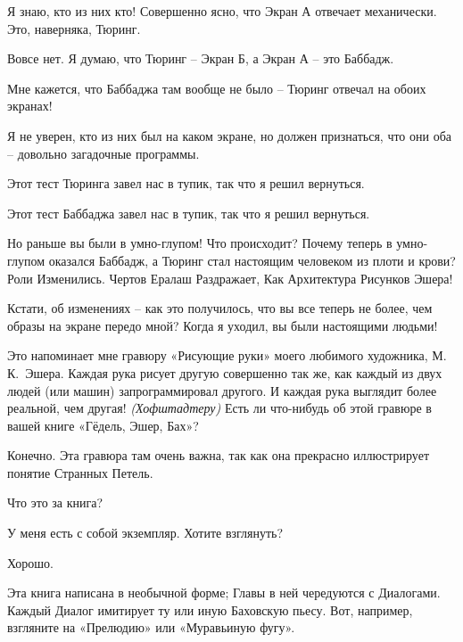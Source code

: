 \documentclass[../main.tex]{subfiles}
\begin{document}
\begin{dialogue}
 Я знаю, кто из них кто! Совершенно ясно, что Экран А отвечает механически. Это, наверняка, Тюринг.

 Вовсе нет. Я думаю, что Тюринг \--- Экран Б, а Экран А \--- это Баббадж.

 Мне кажется, что Баббаджа там вообще не было \--- Тюринг отвечал на обоих экранах!

 Я не уверен, кто из них был на каком экране, но должен признаться, что они оба \--- довольно загадочные программы.


 Этот тест Тюринга завел нас в тупик, так что я решил вернуться.

 Этот тест Баббаджа завел нас в тупик, так что я решил вернуться.

 Но раньше вы были в умно-глупом! Что происходит? Почему теперь в умно-глупом оказался Баббадж, а Тюринг стал настоящим человеком из плоти и крови? Роли Изменились. Чертов Ералаш Раздражает, Как Архитектура Рисунков Эшера!

 Кстати, об изменениях \--- как это получилось, что вы все теперь не более, чем образы на экране передо мной? Когда я уходил, вы были настоящими людьми!

 Это напоминает мне гравюру «Рисующие руки» моего любимого художника, М.\,К.~Эшера. Каждая рука рисует другую совершенно так же, как каждый из двух людей (или машин) запрограммировал другого. И каждая рука выглядит более реальной, чем другая! \emph{(Хофштадтеру)} Есть ли что-нибудь об этой гравюре в вашей книге «Гёдель, Эшер, Бах»?

 Конечно. Эта гравюра там очень важна, так как она прекрасно иллюстрирует понятие Странных Петель.

 Что это за книга?

 У меня есть с собой экземпляр. Хотите взглянуть?

 Хорошо.


 Эта книга написана в необычной форме; Главы в ней чередуются с Диалогами. Каждый Диалог имитирует ту или иную Баховскую пьесу. Вот, например, взгляните на «Прелюдию» или «Муравьиную фугу».


\end{dialogue}
\end{document}
